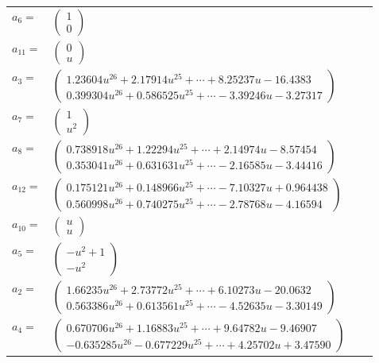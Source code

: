 \documentclass[1p]{elsarticle_modified}
\theoremstyle{definition}
\begin{document}
\begin{tabular}{m{7pt} m{180pt} m{7pt} m{180pt} }
\flushright $a_{6}=$&$\begin{pmatrix}1\\0\end{pmatrix}$ \\
\flushright $a_{11}=$&$\begin{pmatrix}0\\u\end{pmatrix}$ \\
\flushright $a_{3}=$&$\begin{pmatrix}1.23604 u^{26}+2.17914 u^{25}+\cdots+8.25237 u-16.4383\\0.399304 u^{26}+0.586525 u^{25}+\cdots-3.39246 u-3.27317\end{pmatrix}$ \\
\flushright $a_{7}=$&$\begin{pmatrix}1\\u^2\end{pmatrix}$ \\
\flushright $a_{8}=$&$\begin{pmatrix}0.738918 u^{26}+1.22294 u^{25}+\cdots+2.14974 u-8.57454\\0.353041 u^{26}+0.631631 u^{25}+\cdots-2.16585 u-3.44416\end{pmatrix}$ \\
\flushright $a_{12}=$&$\begin{pmatrix}0.175121 u^{26}+0.148966 u^{25}+\cdots-7.10327 u+0.964438\\0.560998 u^{26}+0.740275 u^{25}+\cdots-2.78768 u-4.16594\end{pmatrix}$ \\
\flushright $a_{10}=$&$\begin{pmatrix}u\\u\end{pmatrix}$ \\
\flushright $a_{5}=$&$\begin{pmatrix}- u^2+1\\- u^2\end{pmatrix}$ \\
\flushright $a_{2}=$&$\begin{pmatrix}1.66235 u^{26}+2.73772 u^{25}+\cdots+6.10273 u-20.0632\\0.563386 u^{26}+0.613561 u^{25}+\cdots-4.52635 u-3.30149\end{pmatrix}$ \\
\flushright $a_{4}=$&$\begin{pmatrix}0.670706 u^{26}+1.16883 u^{25}+\cdots+9.64782 u-9.46907\\-0.635285 u^{26}-0.677229 u^{25}+\cdots+4.25702 u+3.47590\end{pmatrix}$ \\

\end{tabular}
\end{document}
